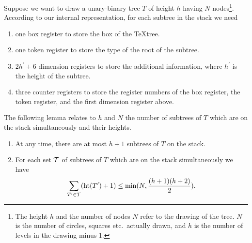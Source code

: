 Suppose we want to draw a unary-binary tree $T$ of height $h$ having            
$N$ nodes\footnote{The height $h$ and the number of nodes $N$ refer to the
drawing of the tree. $N$ is the number of circles, squares etc.~actually
drawn, and $h$ is the number of levels in the drawing minus 1.}.
According to our internal representation,                            
for each subtree in the stack we need                                           
                                                                                
\begin{enumerate}                                                               
\item one box register to store the box of the \TeX{}tree.                       
\item one token register to store the type of the root of the subtree.           
\item $2h^\prime+6$ dimension registers to store the additional 
      information, where $h^\prime$ is the height of the                        
      subtree.                                                                   
\item three counter registers to store the register numbers of the             
      box register, the token register, and the first dimension register above.         
\end{enumerate}                                                                 
                                                                                
The following lemma relates to $h$ and $N$ the number
of subtrees of $T$ which are on the      
stack simultaneously and their heights.                          
                                                                                
\begin{lemma}                                                                   
\begin{enumerate}                                                               
\item At any time, there are at most $h+1$ subtrees of $T$ on the               
      stack.                                                                    
\item For each set ${\cal T}$ of subtrees of $T$ which are on the stack               
      simultaneously we have                                                    
      $$\sum_{T^\prime\in {\cal T}}({\rm ht}(T^\prime)+1)                             
        \le\min(N,{(h+1)(h+2)\over2}).$$                                      
\end{enumerate}                                                                 
\end{lemma}                                                                     
                                                                                
